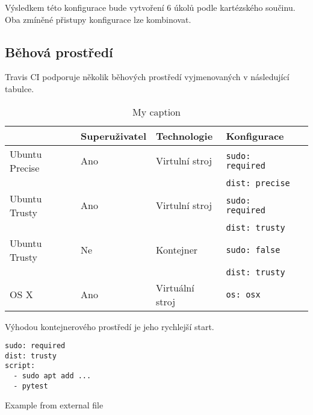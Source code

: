 Výsledkem této konfigurace bude vytvoření 6 úkolů podle kartézského součinu.
Oba zmíněné přistupy konfigurace lze kombinovat.


\subsection{Běhová prostředí}

Travis CI podporuje několik běhových prostředí vyjmenovaných v následující tabulce.

\begin{table}[h]
\centering
\caption{My caption}
\label{my-label}
\begin{tabular}{l|llll}
               & Superuživatel & Technologie & Konfigurace  \\ \hline
Ubuntu Precise & Ano & Virtulní stroj & \verb|sudo: required| &  \\ 
& & & \verb|dist: precise| &  \\ \hline
Ubuntu Trusty & Ano & Virtulní stroj & \verb|sudo: required|  &  \\
& & & \verb|dist: trusty| &  \\ \hline
Ubuntu Trusty & Ne & Kontejner & \verb|sudo: false|  &  \\
& & & \verb|dist: trusty| &  \\ \hline
OS X & Ano & Virtuální stroj & \verb|os: osx|  &  \\
\end{tabular}
\end{table}

Výhodou kontejnerového prostředí je jeho rychlejší start.


\begin{listing}[ht]
\begin{verbatim}
sudo: required
dist: trusty
script:
  - sudo apt add ...
  - pytest
\end{verbatim}
\caption{Example from external file}
\label{listing:3}
\end{listing}




